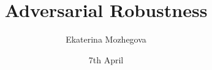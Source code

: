 




% 


\documentclass{article}

\usepackage{graphicx} %
\usepackage{amsmath} %
\usepackage{hyperref} %
\usepackage{listings} %
\usepackage{float} %

\title{Adversarial Robustness}
\author{Ekaterina Mozhegova}
\date{7th April}



\maketitle

The study is based on the tutorial "Adversarial Robustness - Theory and Practice".

\begin{abstract}


  Adversarial attacks are small yet malicious perturbations applied to input datasets. Often invisible to the human eye, they can damage the internal structure of the model and 
  consequently its accuracy and reliability. These attacks pose a threat to security-critical tasks, including computer vision and natural language processing, among others.
\end{abstract}

